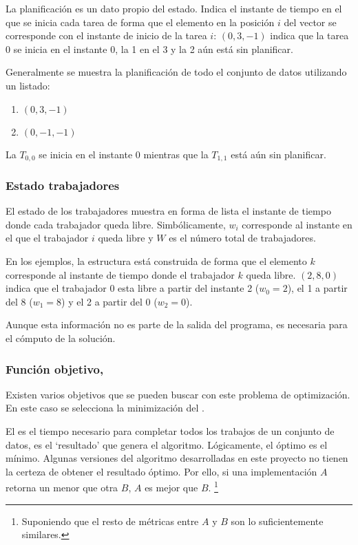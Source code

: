 La planificación es un dato propio del estado.
Indica el instante de tiempo en el que se inicia cada tarea
de forma que el elemento en la posición $i$ del vector se
corresponde con el instante de inicio de la tarea $i$:
$(0, 3, -1)$ indica que la tarea 0 se inicia en el instante 0,
la 1 en el 3 y la 2 aún está sin planificar.

Generalmente se muestra la planificación de todo el conjunto de datos
utilizando un listado:
\begin{enumerate}[start=0, itemsep=0.25px]
    \item $(0, 3, -1)$
    \item $(0, -1, -1)$
\end{enumerate}
La $T_{0,0}$ se inicia en el instante 0 mientras que la $T_{1,1}$ está aún sin planificar.

\subsubsection{Estado trabajadores}

El estado de los trabajadores muestra en forma de lista
el instante de tiempo donde cada trabajador queda libre.
Simbólicamente, $w_i$ corresponde al instante
en el que el trabajador $i$ queda libre y
$W$ es el número total de trabajadores.

En los ejemplos, la estructura está construida de forma que el elemento $k$
corresponde al instante de tiempo donde el trabajador $k$
queda libre.
$(2, 8, 0)$ indica que el trabajador 0 esta libre a partir del instante 2
($w_0 = 2$),
el 1 a partir del 8
($w_1 = 8$)
y el 2 a partir del 0
($w_2 = 0$).

Aunque esta información no es parte de la salida del programa,
es necesaria para el cómputo de la solución.

\subsubsection{Función objetivo, }

Existen varios objetivos que se pueden buscar con este problema
de optimización.
En este caso se selecciona la minimización del .

El  es el tiempo necesario para completar
todos los trabajos de un conjunto de datos,
es el `resultado' que genera el algoritmo.
Lógicamente, el  óptimo es el mínimo.
Algunas versiones del algoritmo desarrolladas en este proyecto
no tienen la certeza de obtener el resultado óptimo.
Por ello, si una implementación $A$ retorna
un  menor que otra $B$,
$A$ es mejor que $B$. \footnote{
    Suponiendo que el resto de métricas entre $A$ y $B$
    son lo suficientemente similares.
}

